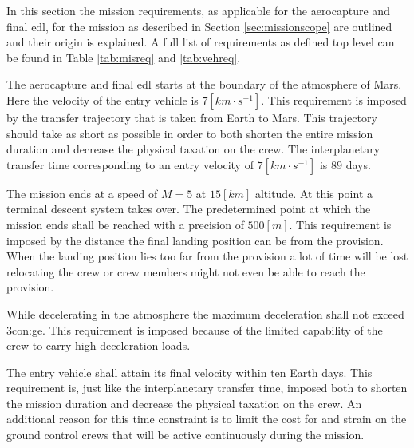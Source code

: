 In this section the mission requirements, as applicable for the aerocapture and final \gls{edl}, for the mission as described in Section \ref{sec:missionscope} are outlined and their origin is explained. A full list of requirements as defined top level can be found in Table \ref{tab:misreq} and \ref{tab:vehreq}.

The aerocapture and final \gls{edl} starts at the boundary of the atmosphere of Mars. Here the velocity of the entry vehicle is $7 \left[km \cdot s^{-1} \right]$. This requirement is imposed by the transfer trajectory that is taken from Earth to Mars. This trajectory should take as short as possible in order to both shorten the entire mission duration and decrease the physical taxation on the crew. The interplanetary transfer time corresponding to an entry velocity of $7 \left[km \cdot s^{-1} \right]$ is $89$ days. 

The mission ends at a speed of $M=5$ at $15 \left[km\right]$ altitude. At this point a terminal descent system takes over. The predetermined point at which the mission ends shall be reached with a precision of $500 \left[m\right]$. This requirement is imposed by the distance the final landing position can be from the provision. When the landing position lies too far from the provision a lot of time will be lost relocating the crew or crew members might not even be able to reach the provision.

While decelerating in the atmosphere the maximum deceleration shall not exceed 3\gls{con:ge}. This requirement is imposed because of the limited capability of the crew to carry high deceleration loads.

The entry vehicle shall attain its final velocity within ten Earth days. This requirement is, just like the interplanetary transfer time, imposed both to shorten the mission duration and decrease the physical taxation on the crew. An additional reason for this time constraint is to limit the cost for and strain on the ground control crews that will be active continuously during the mission.


